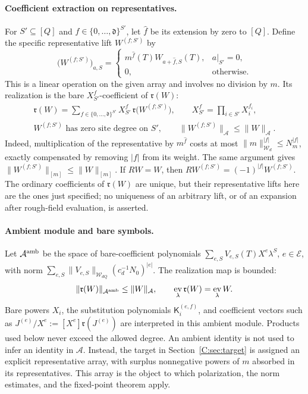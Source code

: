 \documentclass[11pt]{article}
\DeclareMathOperator{\ev}{ev}
\newcommand{\cW}{\mathcal{W}}
\newcommand{\cA}{\mathcal{A}}
\newcommand{\cE}{\mathcal{E}}
\newcommand{\norm}[1]{\lVert #1\rVert}
\newcommand{\abs}[1]{\lvert #1\rvert}
\newcommand{\dg}{\mathfrak{d}}
\newcommand{\K}{\mathsf{K}}
\newcommand{\realize}{\mathfrak r}
\begin{document}
\paragraph{Coefficient extraction on representatives.}
For \(S'\subseteq[Q]\) and \(f\in\{0,\dots,\dg\}^{S'}\), let
\(\widehat f\) be its extension by zero to \([Q]\).  Define the specific
representative lift \(W^{(f;S')}\) by
\[
 \bigl(W^{(f;S')}\bigr)_{a,S}
 =\begin{cases}
   m^{\widehat f}(T)W_{a+\widehat f,S}(T),&a|_{S'}=0,\\
   0,&\text{otherwise}.
  \end{cases}
\]
This is a linear operation on the given array and involves no division
by \(m\).  Its realization is the bare \(X_{S'}^f\)-coefficient of
\(\realize(W)\):
\begin{equation}
 \begin{gathered}
  \realize(W)=\sum_{f\in\{0,\dots,\dg\}^{S'}}
       X_{S'}^f\,\realize\bigl(W^{(f;S')}\bigr),
  \qquad X_{S'}^f=\prod_{i\in S'}X_i^{f_i},\\
  W^{(f;S')}\text{ has zero site degree on }S',
  \qquad \norm{W^{(f;S')}}_\cA\le\norm W_\cA .
 \end{gathered}
 \label{C:eq:decomp}
\end{equation}
Indeed, multiplication of the representative by \(m^{\widehat f}\)
costs at most \(\norm m_{\cW_d}^{\abs f}\le N_m^{\abs f}\), exactly
compensated by removing \(\abs f\) from its weight.  The same argument
gives \(\norm{W^{(f;S')}}_{[m]}\le\norm W_{[m]}\).
If \(RW=W\), then \(RW^{(f;S')}=(-1)^{\abs f}W^{(f;S')}\).
The ordinary coefficients of \(\realize(W)\) are unique, but their
representative lifts here are the ones just specified; no uniqueness of
an arbitrary lift, or of an expansion after rough-field evaluation, is
asserted.

\paragraph{Ambient module and bare symbols.}
Let \(\cA^{\rm amb}\) be the space of bare-coefficient polynomials
\(\sum_{e,S}V_{e,S}(T)X^e\lambda^S\), \(e\in\cE\), with norm
\(\sum_{e,S}\norm{V_{e,S}}_{\cW_{dQ}}(c_d^{-1}N_0)^{\abs e}\).
The realization map is bounded:
\[
 \norm{\realize(W)}_{\cA^{\rm amb}}\le\norm W_\cA,
 \qquad
 \ev_\lambda\realize(W)=\ev_\lambda W.
\]
Bare powers \(X_i\), the substitution polynomials
\(\K_i^{(e,f)}\), and coefficient vectors such as
\(J^{(e)}/X^e:=[X^e]\realize(J^{(e)})\) are interpreted in this ambient
module.  Products used below never exceed the allowed degree.
An ambient identity is not used to infer an identity in \(\cA\).
Instead, the target in Section~\ref{C:sec:target} is assigned an explicit
representative array, with surplus nonnegative powers of \(m\) absorbed
in its representatives.  This array is the object to which
polarization, the norm estimates, and the fixed-point theorem apply.
\end{document}
